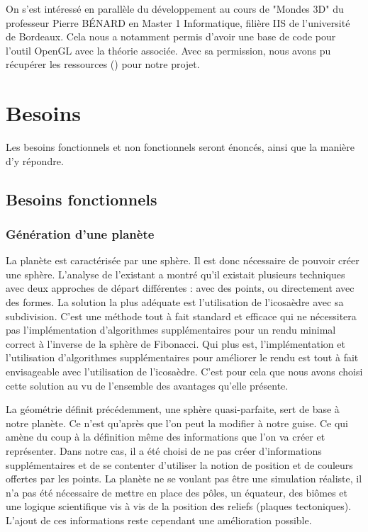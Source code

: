 \documentclass[a4paper]{article}
\begin{document}
    On s'est intéressé en parallèle du développement au cours de "Mondes 3D" du professeur Pierre BÉNARD en Master 1 Informatique, filière IIS de l'université de Bordeaux. Cela nous a notamment permis d'avoir une base de code pour l'outil OpenGL avec la théorie associée. Avec sa permission, nous avons pu récupérer les ressources (\cite{TD_3D}) pour notre projet.

\newpage 
\section{Besoins}

Les besoins fonctionnels et non fonctionnels seront énoncés, ainsi que la manière d'y répondre.

\subsection{Besoins fonctionnels}

\subsubsection{Génération d'une planète}

\label{geo_planet}
La planète est caractérisée par une sphère. Il est donc nécessaire de pouvoir créer une sphère. L’analyse de l’existant a montré qu’il existait plusieurs techniques avec deux approches de départ différentes : avec des points, ou directement avec des formes. La solution la plus adéquate est l’utilisation de l’icosaèdre avec sa subdivision. C’est une méthode tout à fait standard et efficace qui ne nécessitera pas l’implémentation d’algorithmes supplémentaires pour un rendu minimal correct à l’inverse de la sphère de Fibonacci. Qui plus est, l’implémentation et l’utilisation d’algorithmes supplémentaires pour améliorer le rendu est tout à fait envisageable avec l’utilisation de l’icosaèdre. C'est pour cela que nous avons choisi cette solution au vu de l'ensemble des avantages qu'elle présente.

La géométrie définit précédemment, une sphère quasi-parfaite, sert de base à notre planète. Ce n’est qu'après que l'on peut la modifier à notre guise. Ce qui amène du coup à la définition même des informations que l’on va créer et représenter. Dans notre cas, il a été choisi de ne pas créer d'informations supplémentaires et de se contenter d'utiliser la notion de position et de couleurs offertes par les points. La planète ne se voulant pas être une simulation réaliste, il n'a pas été nécessaire de mettre en place des pôles, un équateur, des biômes et une logique scientifique vis à vis de la position des reliefs (plaques tectoniques). L'ajout de ces informations reste cependant une amélioration possible.
\end{document}
